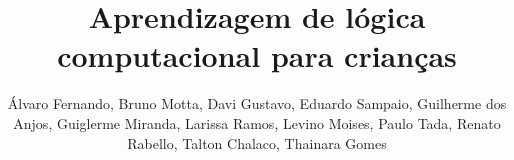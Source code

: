 \sloppy

\title{Aprendizagem de lógica computacional para crianças}

\author{Álvaro Fernando, Bruno Motta, Davi Gustavo, Eduardo Sampaio, Guilherme dos Anjos, Guiglerme Miranda, Larissa Ramos, Levino Moises, Paulo Tada, Renato Rabello, Talton Chalaco, Thainara Gomes}

\address{Faculdade Gama - Universidade de Brasília (UnB)}

